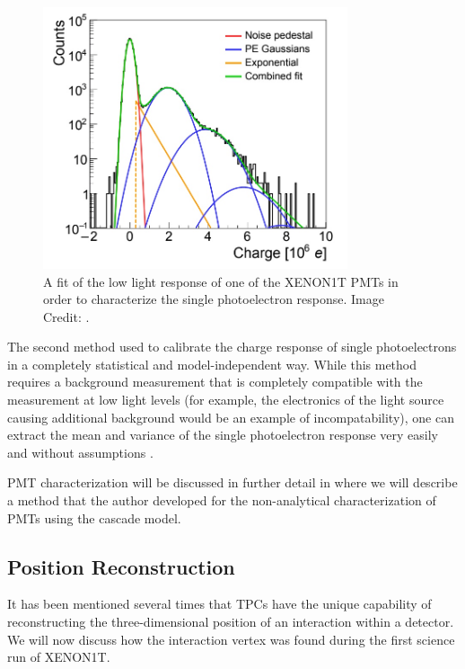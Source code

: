 \begin{figure}[t]
	\centering
	\includegraphics[width=0.8\textwidth]{xe1t_spe_gaussian}
	\caption{A fit of the low light response of one of the XENON1T PMTs in order to characterize the single photoelectron response.  Image Credit: .}
	\label{fig:xe1t_spe_gaussian}
\end{figure}


The second method used to calibrate the charge response of single photoelectrons in a completely statistical and model-independent way.  While this method requires a background measurement that is completely compatible with the measurement at low light levels (for example, the electronics of the light source causing additional background would be an example of incompatability), one can extract the mean and variance of the single photoelectron response very easily and without assumptions \cite{saldanha2017model}.

PMT characterization will be discussed in further detail in  where we will describe a method that the author developed for the non-analytical characterization of PMTs using the cascade model.




\subsection{Position Reconstruction}
\label{sec:xe1t_pos_rec}

It has been mentioned several times that TPCs have the unique capability of reconstructing the three-dimensional position of an interaction within a detector.  We will now discuss how the interaction vertex was found during the first science run of XENON1T.


